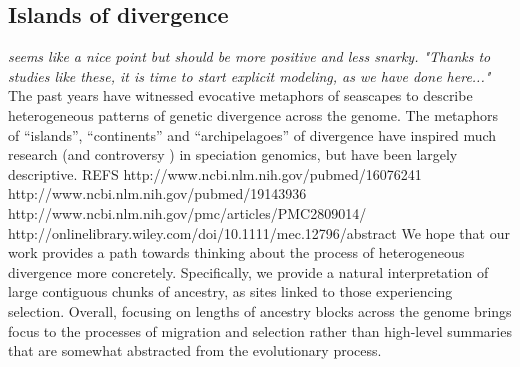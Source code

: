 \documentclass[11pt,letterpaper]{article}
\newcommand{\alisa}[1]{{\em \color{red} #1}}
\newcommand{\plr}[1]{{\em \color{blue} #1}}
\newcommand{\yb}[1]{{\em \color{magenta} #1}}
\begin{document}





\subsection*{Islands of divergence}  

\plr{seems like a nice point but should be more positive and less snarky.  "Thanks to studies like these, it is time to start explicit modeling, as we have done here..."}
The past years have witnessed evocative metaphors of seascapes to describe heterogeneous patterns of genetic divergence across the genome.  
The metaphors of ``islands'', ``continents'' and ``archipelagoes'' of divergence \citep{Turner2005, Nosil2009} have inspired much research (and controversy  \citep{Noor2009,Cruickshank2014}) in speciation genomics, but have been largely descriptive.  
REFS  http://www.ncbi.nlm.nih.gov/pubmed/16076241 http://www.ncbi.nlm.nih.gov/pubmed/19143936 http://www.ncbi.nlm.nih.gov/pmc/articles/PMC2809014/ http://onlinelibrary.wiley.com/doi/10.1111/mec.12796/abstract
We hope that our work provides a path towards thinking about the process of heterogeneous divergence more concretely. %
Specifically, we provide a natural interpretation of large contiguous chunks of ancestry, as sites linked to those experiencing selection.   
Overall, focusing on lengths of ancestry blocks across the genome brings focus to the processes of migration and selection rather than high-level summaries that are somewhat abstracted from the evolutionary process. 
\end{document}
